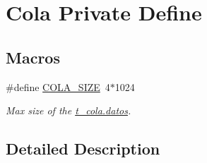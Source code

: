 \hypertarget{group___cola___private___define}{}\section{Cola Private Define}
\label{group___cola___private___define}
\subsection*{Macros}
\begin{DoxyCompactItemize}
\item 
\#define \hyperlink{group___cola___private___define_gad5b7f14b39751409f4090d7c2d45f915}{C\+O\+L\+A\+\_\+\+S\+I\+ZE}~4$\ast$1024\hypertarget{group___cola___private___define_gad5b7f14b39751409f4090d7c2d45f915}{}\label{group___cola___private___define_gad5b7f14b39751409f4090d7c2d45f915}

\begin{DoxyCompactList}\small\item\em Max size of the \hyperlink{structt__cola_a8eaaf6d0a3ebef35b2d6c94e9a63bf3d}{t\+\_\+cola.\+datos}. \end{DoxyCompactList}\end{DoxyCompactItemize}


\subsection{Detailed Description}

